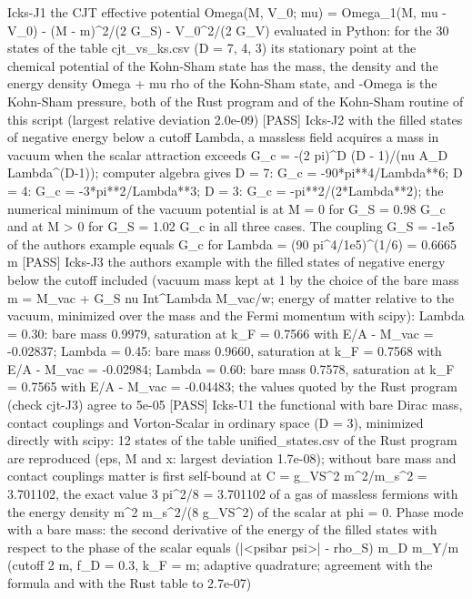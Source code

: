\documentclass[
  10pt,
]{article}
\newenvironment{Shaded}{}{}
\newcommand{\NormalTok}[1]{#1}
\begin{document}
\begin{Shaded}
\begin{Highlighting}[]
\NormalTok{[PASS] Icks{-}J1  the CJT effective potential Omega(M, V\_0; mu) = Omega\_1(M, mu {-} V\_0) {-} (M {-} m)\^{}2/(2 G\_S) {-} V\_0\^{}2/(2 G\_V) evaluated in Python: for the 30 states of the table cjt\_vs\_ks.csv (D = 7, 4, 3) its stationary point at the chemical potential of the Kohn{-}Sham state has the mass, the density and the energy density Omega + mu rho of the Kohn{-}Sham state, and {-}Omega is the Kohn{-}Sham pressure, both of the Rust program and of the Kohn{-}Sham routine of this script (largest relative deviation 2.0e{-}09)}
\NormalTok{[PASS] Icks{-}J2  with the filled states of negative energy below a cutoff Lambda, a massless field acquires a mass in vacuum when the scalar attraction exceeds G\_c = {-}(2 pi)\^{}D (D {-} 1)/(nu A\_D Lambda\^{}(D{-}1)); computer algebra gives D = 7: G\_c = {-}90*pi**4/Lambda**6; D = 4: G\_c = {-}3*pi**2/Lambda**3; D = 3: G\_c = {-}pi**2/(2*Lambda**2); the numerical minimum of the vacuum potential is at M = 0 for G\_S = 0.98 G\_c and at M \textgreater{} 0 for G\_S = 1.02 G\_c in all three cases. The coupling G\_S = {-}1e5 of the author\textquotesingle{}s example equals G\_c for Lambda = (90 pi\^{}4/1e5)\^{}(1/6) = 0.6665 m}
\NormalTok{[PASS] Icks{-}J3  the author\textquotesingle{}s example with the filled states of negative energy below the cutoff included (vacuum mass kept at 1 by the choice of the bare mass m = M\_vac + G\_S nu Int\^{}Lambda M\_vac/w; energy of matter relative to the vacuum, minimized over the mass and the Fermi momentum with scipy): Lambda = 0.30: bare mass 0.9979, saturation at k\_F = 0.7566 with E/A {-} M\_vac = {-}0.02837; Lambda = 0.45: bare mass 0.9660, saturation at k\_F = 0.7568 with E/A {-} M\_vac = {-}0.02984; Lambda = 0.60: bare mass 0.7578, saturation at k\_F = 0.7565 with E/A {-} M\_vac = {-}0.04483; the values quoted by the Rust program (check cjt{-}J3) agree to 5e{-}05}
\NormalTok{[PASS] Icks{-}U1  the functional with bare Dirac mass, contact couplings and Vorton{-}Scalar in ordinary space (D = 3), minimized directly with scipy: 12 states of the table unified\_states.csv of the Rust program are reproduced (eps, M and x: largest deviation 1.7e{-}08); without bare mass and contact couplings matter is first self{-}bound at C = g\_VS\^{}2 m\^{}2/m\_s\^{}2 = 3.701102, the exact value 3 pi\^{}2/8 = 3.701102 of a gas of massless fermions with the energy density m\^{}2 m\_s\^{}2/(8 g\_VS\^{}2) of the scalar at phi = 0. Phase mode with a bare mass: the second derivative of the energy of the filled states with respect to the phase of the scalar equals (|\textless{}psibar psi\textgreater{}| {-} rho\_S) m\_D m\_Y/m (cutoff 2 m, f\_D = 0.3, k\_F = m; adaptive quadrature; agreement with the formula and with the Rust table to 2.7e{-}07)}

\end{Highlighting}
\end{Shaded}
\end{document}

